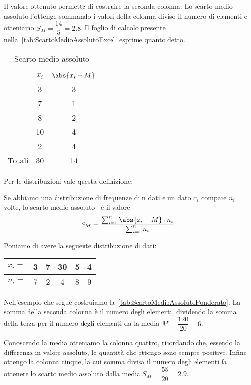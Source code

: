 Il valore ottenuto permette di costruire la seconda colonna. Lo scarto medio assoluto  l'ottengo sommando i valori della colonna diviso il numero di elementi e otteniamo  $S_{M}=\dfrac{14}{5}=\num{2.8}$. Il foglio di calcolo presente nella~\vref{tab:ScartoMedioAssolutoExcel} esprime quanto detto.
\begin{table}
	\centering
	\begin{tabular}{l*{2} {S[table-format=2.0]}}
		\toprule
	&{$x_{i}$}	& {$\abs{x_{i}-M} $} \\
	\midrule 
		&3&  3\\ 
		&7&1  \\ 
		&8& 2 \\ 
		&10&4  \\ 
		&2& 4 \\ 
		\midrule
		{Totali}&30&14  \\
		\bottomrule 
	\end{tabular} 
	\caption{Scarto medio assoluto}
	\label{tab:ScartoMedioAssoluto}
\end{table}
Per le distribuzioni vale questa definizione:
\begin{defn}
	Se abbiamo una distribuzione di frequenze di n dati e un dato $x_{i}$ compare $n_{i}$ volte,  lo scarto medio assoluto~ è  il valore \[ S_{M}=\dfrac{\sum_{i=1}^{n}\abs{x_{i}-M}\cdot n_{i} }{  \sum_{i=1}^{n} n_{i}}\]
\end{defn}
Poniamo di avere la seguente distribuzione di dati:
\begin{center}
	\begin{tabular}{l*{2} {S[table-format=1.0]}S[table-format=2.0]*{2} {S[table-format=1.0]}}
		{$x_{i}=$}	&3  &7  &30  &5  &4 \\
		\midrule 
		{$n_{i}=$}	& 7 &2  & 4 & 8 & 9\\   
	\end{tabular}
\end{center}
Nell'esempio che segue costruiamo la~\vref{tab:ScartoMedioAssolutoPonderato}.  La somma della seconda colonna è il numero degli elementi, dividendo la somma della terza per il numero degli elementi da la media $M=\dfrac{\num{120}}{\num{20}}=\num{6}$. 

Conoscendo la media otteniamo la colonna quattro, ricordando che, essendo la differenza in valore assoluto, le quantità che ottengo sono sempre positive. Infine ottengo la colonna cinque, la cui somma divisa il numero degli elementi   fa ottenere lo scarto medio assoluto dalla media $S_{M}=\dfrac{\num{58}}{\num{20}}=\num{2.9}$. 

